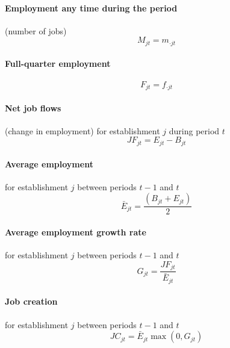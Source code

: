 \paragraph{Employment any time during the period}

(number of jobs) 
\begin{equation}
M_{jt}=m_{\cdot jt}
\end{equation}

\paragraph{Full-quarter employment}

\begin{equation}
F_{jt}=f_{\cdot jt}
\end{equation}

\paragraph{Net job flows}

(change in employment) for establishment $j$ during period $t$%
\begin{equation}
JF_{jt}=E_{jt}-B_{jt}
\label{eq:JFjt}
\end{equation}

\paragraph{Average employment}

for establishment $j$ between periods $t-1$ and $t$%
\begin{equation}
\bar{E}_{jt}=\frac{\left( B_{jt}+E_{jt}\right) }{2}  \label{eq:ebarjt}
\end{equation}

\paragraph{Average employment growth rate}

for establishment $j$ between periods $t-1$ and $t$%
\begin{equation}
G_{jt}=\frac{JF_{jt}}{\bar{E}_{jt}}  \label{eq:Gjt}
\end{equation}

\paragraph{Job creation}

for establishment $j$ between periods $t-1$ and $t$%
\begin{equation}
JC_{jt}=\bar{E}_{jt}\max \left( {0,}G_{jt}\right)  \label{eq:JCjt}
\end{equation}

